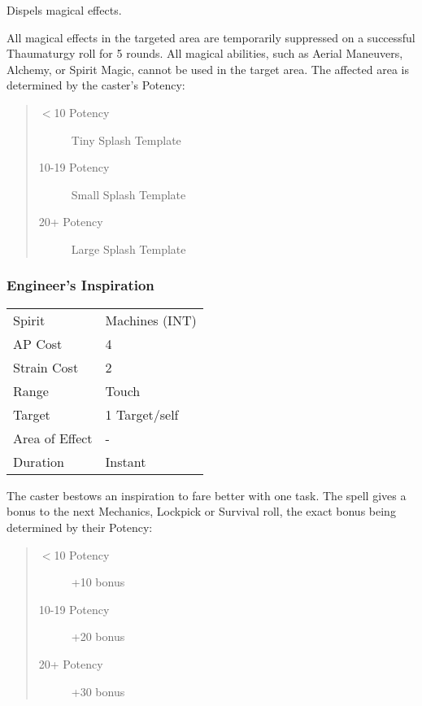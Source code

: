 \documentclass[11pt,a4paper,twocolumn]{book}
\begin{document}
\medskip

Dispels magical effects.

All magical effects in the targeted area are temporarily suppressed on a successful Thaumaturgy roll for 5 rounds. All magical abilities, such as Aerial Maneuvers, Alchemy, or Spirit Magic, cannot be used in the target area. The affected area is determined by the caster's Potency:

\begin{quote}
	\begin{description}
		\item[$<$10 Potency] 	Tiny Splash Template
		\item[10-19 Potency] 	Small Splash Template
		\item[20+ Potency] 	Large Splash Template
	\end{description}
\end{quote}

\subsubsection*{Engineer's Inspiration}
{
	\begin{tabu} to 70mm{| X[l,4] | X[l,7] |}
		\hline
		Spirit         & Machines (INT) \\
		AP Cost        & 4              \\
		Strain Cost    & 2              \\
		Range          & Touch          \\
		Target         & 1 Target/self  \\
		Area of Effect & -              \\
		Duration       & Instant        \\ \hline
	\end{tabu}
	
}
\medskip

The caster bestows an inspiration to fare better with one task. The spell gives a bonus to the next Mechanics, Lockpick or Survival roll, the exact bonus being determined by their Potency:

\begin{quote}
	\begin{description}
		\item[$<$10 Potency] 	+10 bonus
		\item[10-19 Potency] 	+20 bonus
		\item[20+ Potency] 	    +30 bonus
	\end{description}
\end{quote}
\end{document}
